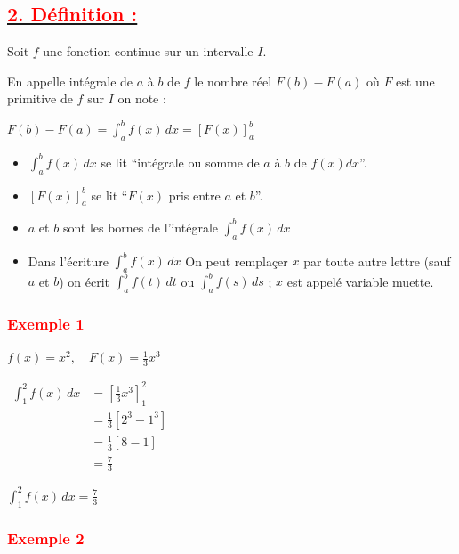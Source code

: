 \documentclass[12pt,a4paper]{article}
\begin{document}
\subsection*{\underline{\textbf{\textcolor{red}{2. Définition :}}}}

Soit \( f \) une fonction continue sur un intervalle \( I \).

En appelle intégrale de \( a \) à \( b \) de \( f \) le nombre réel \( F(b) - F(a) \) où \( F \) est une primitive de \( f \) sur \( I \) on note :

\(
F(b) - F(a) = \int_{a}^{b} f(x) \, dx = \left[ F(x) \right]_{a}^{b}
\)

\begin{itemize}
    \item \( \int_a^b f(x) \, dx \) se lit ``intégrale ou somme  de $a$ à $b$ de $f(x)dx$''.
    \item \( \left[ F(x) \right]_a^b \) se lit ``\( F(x) \) pris entre \( a \) et \( b \)''.
    \item \( a \) et \( b \) sont les bornes de l'intégrale \( \int_a^b f(x) \, dx \)
        \item Dans l'écriture \( \int_a^b f(x) \, dx \) On peut remplaçer \( x \) par toute autre lettre (sauf \( a \) et \( b \)) on écrit \( \int_a^b f(t) \, dt \) ou \( \int_a^b f(s) \, ds \) ; \( x \) est appelé variable muette.
\end{itemize}

\subsubsection*{\textbf{\textcolor{red}{Exemple 1}}}

\(
f(x) = x^2, \quad F(x) = \frac{1}{3} x^3
\)

\(
\begin{aligned}
\int_1^2 f(x) \, dx &= \left[ \frac{1}{3} x^3 \right]_1^2 \\
&= \frac{1}{3} \left[ 2^3 - 1^3 \right] \\
&= \frac{1}{3} \left[ 8 - 1 \right] \\
&= \frac{7}{3}
\end{aligned}
\)

\( \boxed{\int_1^2 f(x) \, dx=\frac{7}{3}} \)

\subsubsection*{\textbf{\textcolor{red}{Exemple 2}}}
\end{document}
